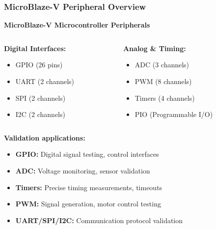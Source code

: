 \documentclass{beamer}
\begin{document}
\begin{frame}
\frametitle{MicroBlaze-V Peripheral Overview}

\begin{center}
\textbf{MicroBlaze-V Microcontroller Peripherals}
\end{center}

\begin{columns}
\begin{column}{0.5\textwidth}
\textbf{Digital Interfaces:}
\begin{itemize}
    \item GPIO (26 pins)
    \item UART (2 channels)
    \item SPI (2 channels)
    \item I2C (2 channels)
\end{itemize}
\end{column}
\begin{column}{0.5\textwidth}
\textbf{Analog \& Timing:}
\begin{itemize}
    \item ADC (3 channels)
    \item PWM (8 channels)
    \item Timers (4 channels)
    \item PIO (Programmable I/O)
\end{itemize}
\end{column}
\end{columns}

\vspace{0.5cm}
\textbf{Validation applications:}
\begin{itemize}
    \item \textbf{GPIO:} Digital signal testing, control interfaces
    \item \textbf{ADC:} Voltage monitoring, sensor validation
    \item \textbf{Timers:} Precise timing measurements, timeouts
    \item \textbf{PWM:} Signal generation, motor control testing
    \item \textbf{UART/SPI/I2C:} Communication protocol validation
\end{itemize}
\end{frame}
\end{document}
